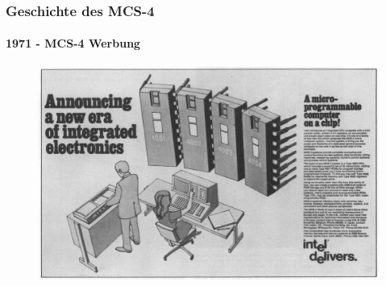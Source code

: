 \begin{frame}
	\frametitle{Geschichte des MCS-4}
	\framesubtitle{1971 - MCS-4 Werbung}
	\begin{figure}[ht]
		\includegraphics[width=0.9\linewidth]{images/intel_ad.png}
	\end{figure}
\end{frame}

